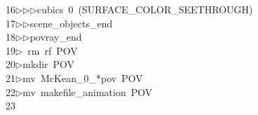 \begin{tabbing}
16\>$\triangleright$\>$\triangleright$\>$\triangleright$\>cubics\ 0\ (SURFACE\_COLOR\_SEETHROUGH)\ \\[0pt]
17\>$\triangleright$\>$\triangleright$\>scene\_objects\_end\ \\[0pt]
18\>$\triangleright$\>$\triangleright$\>povray\_end\\[0pt]
19\>$\triangleright$\>\ rm\ rf\ POV\\[0pt]
20\>$\triangleright$\>mkdir\ POV\\[0pt]
21\>$\triangleright$\>mv\ McKean\_0\_*pov\ POV\\[0pt]
22\>$\triangleright$\>mv\ makefile\_animation\ POV\\[0pt]
23\>\end{tabbing}
